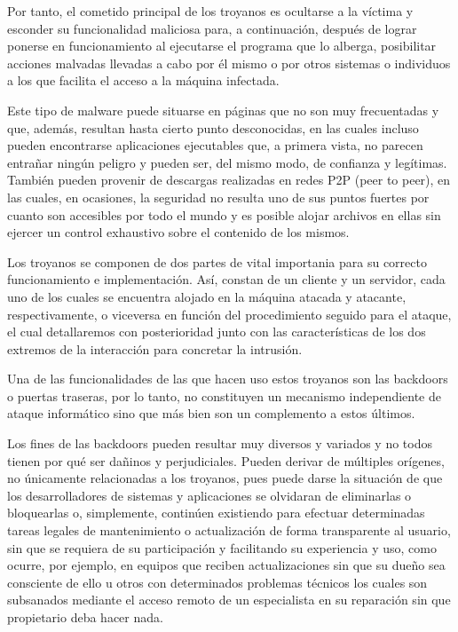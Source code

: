 Por tanto, el cometido principal de los troyanos es ocultarse a la víctima y esconder su funcionalidad maliciosa para, a continuación, después de lograr ponerse en funcionamiento al ejecutarse el programa que lo alberga, posibilitar acciones malvadas llevadas a cabo por él mismo o por otros sistemas o individuos a los que facilita el acceso a la máquina infectada.

Este tipo de malware puede situarse en páginas que no son muy frecuentadas y que, además, resultan hasta cierto punto desconocidas, en las cuales incluso pueden encontrarse aplicaciones ejecutables que, a primera vista, no parecen entrañar ningún peligro y pueden ser, del mismo modo, de confianza y legítimas. También pueden provenir de descargas realizadas en redes P2P (peer to peer), en las cuales, en ocasiones, la seguridad no resulta uno de sus puntos fuertes por cuanto son accesibles por todo el mundo y es posible alojar archivos en ellas sin ejercer un control exhaustivo sobre el contenido de los mismos.

Los troyanos se componen de dos partes de vital importania para su correcto funcionamiento e implementación. Así, constan de un cliente y un servidor, cada uno de los cuales se encuentra alojado en la máquina atacada y atacante, respectivamente, o viceversa en función del procedimiento seguido para el ataque, el cual detallaremos con posterioridad junto con las características de los dos extremos de la interacción para concretar la intrusión.

Una de las funcionalidades de las que hacen uso estos troyanos son las backdoors o puertas traseras, por lo tanto, no constituyen un mecanismo independiente de ataque informático sino que más bien son un complemento a estos últimos.

Los fines de las backdoors pueden resultar muy diversos y variados y no todos tienen por qué ser dañinos y perjudiciales. Pueden derivar de múltiples orígenes, no únicamente relacionadas a los troyanos, pues puede darse la situación de que los desarrolladores de sistemas y aplicaciones se olvidaran de eliminarlas o bloquearlas o, simplemente, continúen existiendo para efectuar determinadas tareas legales de mantenimiento o actualización de forma transparente al usuario, sin que se requiera de su participación y facilitando su experiencia y uso, como ocurre, por ejemplo, en equipos que reciben actualizaciones sin que su dueño sea consciente de ello u otros con determinados problemas técnicos los cuales son subsanados mediante el acceso remoto de un especialista en su reparación sin que propietario deba hacer nada.

